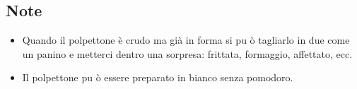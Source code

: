 \subsection{Note}
\begin{itemize}
\item Quando il polpettone è crudo ma già in forma si pu ò tagliarlo in due come un panino e metterci dentro una sorpresa: frittata, formaggio, affettato, ecc.  
\item Il polpettone pu ò essere preparato in bianco senza pomodoro.
\end{itemize}

